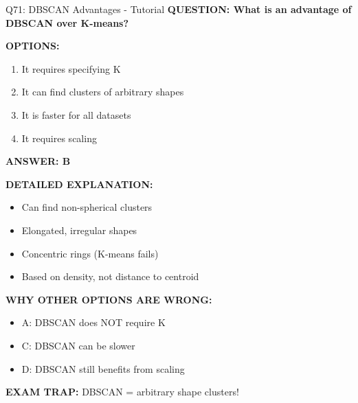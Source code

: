 \documentclass[8pt]{beamer}
\begin{document}
	\begin{frame}{Q71: DBSCAN Advantages - Tutorial}
		\fontsize{6.5}{7.5}\selectfont
		\textbf{QUESTION: What is an advantage of DBSCAN over K-means?}
		
		\vspace{0.1cm}
		\textbf{OPTIONS:}
		\begin{enumerate}
			\item It requires specifying K
			\item It can find clusters of arbitrary shapes
			\item It is faster for all datasets
			\item It requires scaling
		\end{enumerate}
		
		\vspace{0.1cm}
		\textcolor{myblue}{\textbf{ANSWER: B}}
		
		\vspace{0.1cm}
		\textbf{DETAILED EXPLANATION:}
		\begin{itemize}
			\item Can find non-spherical clusters
			\item Elongated, irregular shapes
			\item Concentric rings (K-means fails)
			\item Based on density, not distance to centroid
		\end{itemize}
		
		\vspace{0.1cm}
		\textcolor{myred}{\textbf{WHY OTHER OPTIONS ARE WRONG:}}
		\begin{itemize}
			\item \textcolor{myred}{A:} DBSCAN does NOT require K
			\item \textcolor{myred}{C:} DBSCAN can be slower
			\item \textcolor{myred}{D:} DBSCAN still benefits from scaling
		\end{itemize}
		
		\textcolor{myred}{\textbf{EXAM TRAP:}} DBSCAN = \textcolor{myblue}{arbitrary shape clusters}!
	\end{frame}
	
\end{document}
